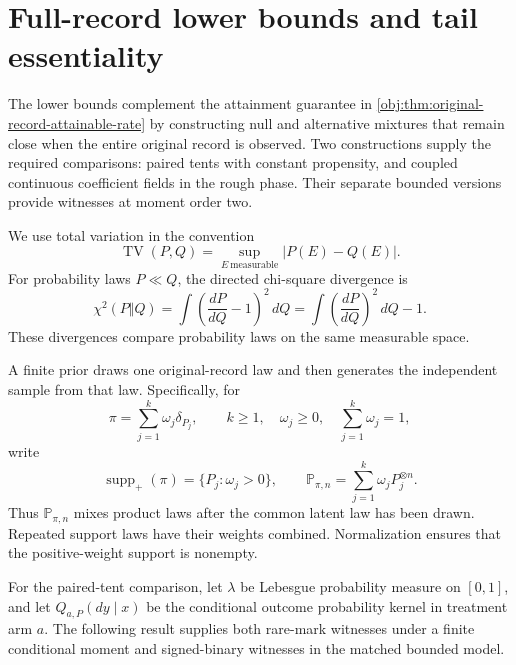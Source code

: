 \documentclass[11pt]{article}
\begin{document}
\section{Full-record lower bounds and tail essentiality}

The lower bounds complement the attainment guarantee in \cref{obj:thm:original-record-attainable-rate} by constructing null and alternative mixtures that remain close when the entire original record is observed. Two constructions supply the required comparisons: paired tents with constant propensity, and coupled continuous coefficient fields in the rough phase. Their separate bounded versions provide witnesses at moment order two.

We use total variation in the convention
\[
\operatorname{TV}(P,Q)=\sup_{E\ \mathrm{measurable}}|P(E)-Q(E)|.
\]
For probability laws \(P\ll Q\), the directed chi-square divergence is
\[
\chi^2(P\Vert Q)
=\int\left(\frac{dP}{dQ}-1\right)^2\,dQ
=\int\left(\frac{dP}{dQ}\right)^2\,dQ-1.
\]
These divergences compare probability laws on the same measurable space.

A finite prior draws one original-record law and then generates the independent sample from that law. Specifically, for
\[
\pi=\sum_{j=1}^{k}\omega_j\delta_{P_j},
\qquad
k\ge1,\quad \omega_j\ge0,\quad \sum_{j=1}^{k}\omega_j=1,
\]
write
\[
\operatorname{supp}_+(\pi)=\{P_j:\omega_j>0\},
\qquad
\mathbb P_{\pi,n}=\sum_{j=1}^{k}\omega_jP_j^{\otimes n}.
\]
Thus \(\mathbb P_{\pi,n}\) mixes product laws after the common latent law has been drawn. Repeated support laws have their weights combined. Normalization ensures that the positive-weight support is nonempty.

For the paired-tent comparison, let \(\lambda\) be Lebesgue probability measure on \([0,1]\), and let \(Q_{a,P}(dy\mid x)\) be the conditional outcome probability kernel in treatment arm \(a\). The following result supplies both rare-mark witnesses under a finite conditional moment and signed-binary witnesses in the matched bounded model.
\end{document}
